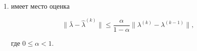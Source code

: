 \begin{theorem}
\begin{enumerate}
        \item[\rm 3)] имеет место оценка

            \begin{equation}

                \label{math/6}

                \bigl\|\bar{\lambda}-\hat{\lambda}^{( k ) }\bigr\|\leq\frac{\alpha}{1-\alpha}\bigl\|\lambda^{( k ) }-\lambda^{( k-1 ) }\bigr\|,

\end{equation}

 где $0\leq\alpha<1.$

    \end{enumerate}

\end{theorem}




